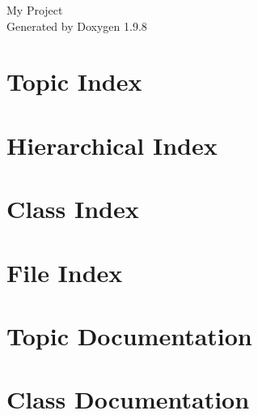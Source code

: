 \documentclass[twoside]{book}
\newcommand{\+}{\discretionary{\mbox{\scriptsize$\hookleftarrow$}}{}{}}
\newcommand{\clearemptydoublepage}{%
    \newpage{\pagestyle{empty}\cleardoublepage}%
  }
\begin{document}
  \raggedbottom
    \hypersetup{pageanchor=false,
                bookmarksnumbered=true,
                pdfencoding=unicode
               }
  \begin{titlepage}
  \vspace*{7cm}
  \begin{center}%
  {\Large My Project}\\
  \vspace*{1cm}
  {\large Generated by Doxygen 1.9.8}\\
  \end{center}
  \end{titlepage}
  \clearemptydoublepage
  \tableofcontents
  \clearemptydoublepage
  \hypersetup{pageanchor=true}

\chapter{Topic Index}

\chapter{Hierarchical Index}

\chapter{Class Index}

\chapter{File Index}

\chapter{Topic Documentation}



\chapter{Class Documentation}



























\end{document}
